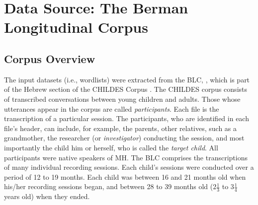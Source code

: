 \section{Data Source: The Berman Longitudinal Corpus}

\subsection{Corpus Overview}
The input datasets (i.e., wordlists) were extracted from the \ac{BLC},   %
\citep{berman-weissenborn:1991},
which is part of the Hebrew section of the CHILDES Corpus \citep{macwhinney:2000a}. 
The CHILDES corpus consists of transcribed 
conversations between young children and adults. Those whose utterances appear in the corpus are
called \emph{participants}. Each file is the transcription of a particular session. 
The participants, who are identified in each file's
header, can include, for example, the parents,
 other relatives, such as a grandmother, 
the researcher (or \emph{investigator}) conducting the session, and most importantly the child him or herself, who is called
the \emph{target child}. All participants were native speakers of \ac{MH}. %
The \ac{BLC} comprises the transcriptions of many individual recording sessions. Each child's sessions 
were conducted over a period of 12 to 19 months.
Each child was between 16 and 21 months old when his/her 
recording sessions began, and between 28 to 39 months old ($2\frac{1}{3}$ to $3\frac{1}{4}$ years old) when they ended.

